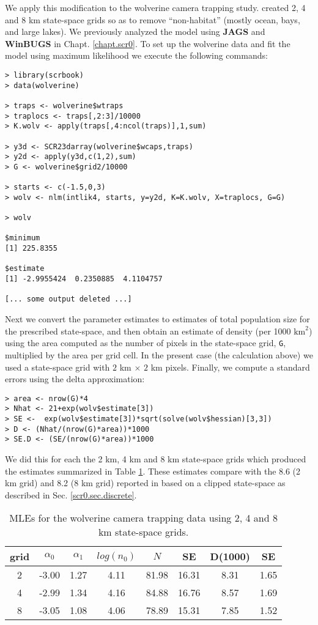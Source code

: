 We apply this modification to the wolverine camera trapping
study. \citet{royle_etal:2011jwm} created 2, 4 and 8 km state-space
grids so as to remove ``non-habitat'' (mostly ocean, bays, and large
lakes). We previously analyzed the model using {\bf JAGS} and {\bf WinBUGS} in
Chapt. \ref{chapt.scr0}.  To set up the wolverine data and fit the
model using maximum likelihood 
we execute the following commands:
{\small 
\begin{verbatim}
> library(scrbook)
> data(wolverine)

> traps <- wolverine$wtraps
> traplocs <- traps[,2:3]/10000
> K.wolv <- apply(traps[,4:ncol(traps)],1,sum)

> y3d <- SCR23darray(wolverine$wcaps,traps)
> y2d <- apply(y3d,c(1,2),sum)
> G <- wolverine$grid2/10000

> starts <- c(-1.5,0,3)
> wolv <- nlm(intlik4, starts, y=y2d, K=K.wolv, X=traplocs, G=G)

> wolv

$minimum
[1] 225.8355

$estimate
[1] -2.9955424  0.2350885  4.1104757

[... some output deleted ...]
\end{verbatim}
}

Next we convert the parameter estimates to estimates of total
population size for the prescribed state-space, and then obtain an
estimate of density (per 1000
$\text{km}^2$) using the area computed as the number of pixels in the
state-space grid, \mbox{\tt G}, multiplied by the area per grid cell. In
the present case (the calculation above) we used a state-space grid
with $2$ km $\times$ $2$ km pixels.  Finally, we compute
a standard errors using the delta approximation: 
\begin{verbatim}
> area <- nrow(G)*4
> Nhat <- 21+exp(wolv$estimate[3])
> SE <-  exp(wolv$estimate[3])*sqrt(solve(wolv$hessian)[3,3])
> D <- (Nhat/(nrow(G)*area))*1000
> SE.D <- (SE/(nrow(G)*area))*1000
\end{verbatim}
We did this for each the 2 km, 4 km and 8 km state-space grids
which produced the estimates summarized in Table \ref{mle.tab.wolv}.
These estimates compare with the 8.6 (2 km grid) and 8.2 (8 km grid)
reported in 
\citet{royle_etal:2011jwm} based on a clipped state-space as described
in Sec. \ref{scr0.sec.discrete}.

\begin{table}
\centering
\caption{MLEs for the wolverine camera trapping data using 2, 4 and 8 km state-space grids.}
\begin{tabular}{cccccccc}
\hline \hline
grid &  $\alpha_0$  &  $\alpha_1$ &   $log(n_0)$  & $N$   &  SE & D(1000) &  SE \\ \hline
2  &  -3.00 & 1.27 &4.11  &81.98& 16.31 &8.31 &1.65\\
4  &  -2.99 & 1.34  &4.16 &84.88& 16.76 &8.57& 1.69\\
8   & -3.05 & 1.08 &4.06  &78.89& 15.31 &7.85& 1.52\\   \hline
\end{tabular}
\label{mle.tab.wolv}
\end{table}


